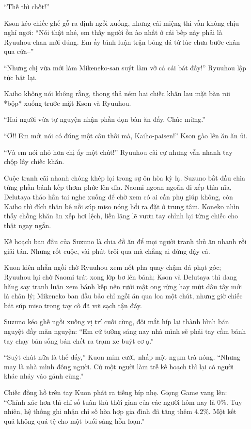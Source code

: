 ﻿\documentclass[../main.tex]{subfiles}
\begin{document}
``Thế thì chốt!''

Kson kéo chiếc ghế gỗ ra định ngồi xuống, nhưng cái miệng thì vẫn không chịu nghỉ ngơi: ``Nói thật nhé, em thấy người ồn ào nhất ở cái bếp này phải là Ryuuhou-chan mới đúng. Em ấy bình luận trận bóng đá từ lúc chưa bước chân qua cửa--''

``Nhưng chị vừa mới làm Mikeneko-san suýt làm vỡ cả cái bát đấy!'' Ryuuhou lập tức bật lại.

Kaiho không nói không rằng, thong thả ném hai chiếc khăn lau mặt bàn rơi *bộp* xuống trước mặt Kson và Ryuuhou.

``Hai người vừa tự nguyện nhận phần dọn bàn ăn đấy. Chúc mừng.''

``Ơ!! Em mới nói có đúng một câu thôi mà, Kaiho-paisen!'' Kson gào lên ăn ăn ủi.

``Và em nói nhỏ hơn chị ấy một chút!'' Ryuuhou cãi cự nhưng vẫn nhanh tay chộp lấy chiếc khăn.

Cuộc tranh cãi nhanh chóng khép lại trong sự ôn hòa kỳ lạ. Suzuno bắt đầu chia từng phần bánh kếp thơm phức lên đĩa. Naomi ngoan ngoãn đi xếp thìa nĩa, Delutaya tháo hẳn tai nghe xuống để chờ xem có ai cần phụ giúp không, còn Kaiho thì đích thân bê nồi súp miso nóng hổi ra đặt ở trung tâm. Koneko nhìn thấy chồng khăn ăn xếp hơi lệch, liền lặng lẽ vươn tay chỉnh lại từng chiếc cho thật ngay ngắn.

\ct

Kế hoạch ban đầu của Suzuno là chia đồ ăn để mọi người tranh thủ ăn nhanh rồi giải tán. Nhưng rốt cuộc, vài phút trôi qua mà chẳng ai đứng dậy cả.

Kuon kiên nhẫn ngồi chờ Ryuuhou xem nốt pha quay chậm đá phạt góc; Ryuuhou lại chờ Naomi trát xong lớp bơ lên bánh; Kson và Delutaya thì đang hăng say tranh luận xem bánh kếp nên rưới mật ong rừng hay mứt dâu tây mới là chân lý; Mikeneko ban đầu bảo chỉ ngồi ăn qua loa một chút, nhưng giờ chiếc bát súp miso trong tay cô đã vơi sạch tận đáy.

Suzuno kéo ghế ngồi xuống vị trí cuối cùng, đôi mắt híp lại thành hình bán nguyệt đầy mãn nguyện: ``Em cứ tưởng sáng nay nhà mình sẽ phải tay cầm bánh tay chạy bán sống bán chết ra trạm xe buýt cơ ạ.''

``Suýt chút nữa là thế đấy,'' Kuon mỉm cười, nhấp một ngụm trà nóng. ``Nhưng may là nhà mình đông người. Cứ một người làm trễ kế hoạch thì lại có người khác nhảy vào gánh cùng.''

Chiếc đồng hồ trên tay Kuon phát ra tiếng bíp nhẹ. Giọng Game vang lên: ``Chính xác hơn thì chỉ số tuân thủ thời gian của các người hôm nay là 0\%. Tuy nhiên, hệ thống ghi nhận chỉ số hòa hợp gia đình đã tăng thêm 4.2\%. Một kết quả không quá tệ cho một buổi sáng hỗn loạn.''
\end{document}
